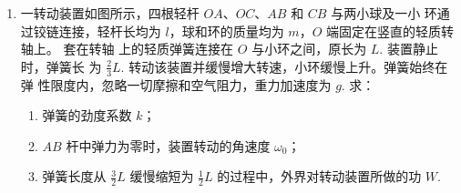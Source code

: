 \begin{enumerate}
\newpage
\item 
{}
一转动装置如图所示，四根轻杆 $ OA $、$ OC $、$ AB $ 和 $ CB $ 与两小球及一小
环通过铰链连接，轻杆长均为 $ l $，球和环的质量均为 $ m $，$ O $ 端固定在竖直的轻质转轴上。 套在转轴
上的轻质弹簧连接在 $ O $ 与小环之间，原长为 $ L $. 装置静止时，弹簧长
为
$ \frac{ 2 }{ 3 } L $. 转动该装置并缓慢增大转速，小环缓慢上升。弹簧始终在弹
性限度内，忽略一切摩擦和空气阻力，重力加速度为 $ g $.
求：
\begin{enumerate}
\renewcommand{\labelenumi}{\arabic{enumi}.}
\item
弹簧的劲度系数 $ k $；



\item 
$ AB $ 杆中弹力为零时，装置转动的角速度 $ \omega_0 $；

\item 
弹簧长度从 $ \frac{ 3 }{ 2 } L $ 缓慢缩短为 $ \frac{ 1 }{ 2 } L $ 的过程中，外界对转动装置所做的功 $ W $.


\end{enumerate}
\begin{figure}[h!]
\flushright

\end{figure}





\end{enumerate}

